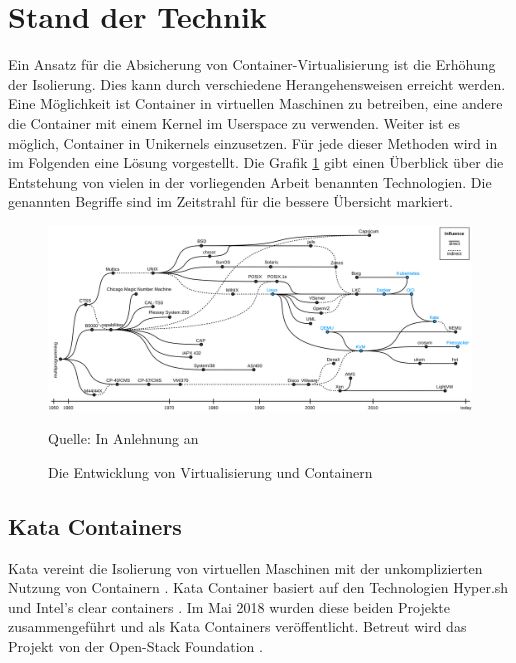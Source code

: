 \section{Stand der Technik}
Ein Ansatz für die Absicherung von Container-Virtualisierung ist die Erhöhung der Isolierung. Dies kann durch verschiedene Herangehensweisen erreicht werden. Eine Möglichkeit ist Container in virtuellen Maschinen zu betreiben, eine andere die Container mit einem Kernel im Userspace zu verwenden. Weiter ist es möglich, Container in Unikernels einzusetzen. Für jede dieser Methoden wird in im Folgenden eine Lösung vorgestellt.
Die Grafik \ref{fig:zeitstrahl_vm_container} gibt einen Überblick über die Entstehung von vielen in der vorliegenden Arbeit benannten Technologien. Die genannten Begriffe sind im Zeitstrahl für die bessere Übersicht markiert.

\begin{figure}[hb]
	\centering
	\includegraphics[width=1\linewidth]{gfx/VM_Container_Zeitstrahl.png}
	\caption{Die Entwicklung von Virtualisierung und Containern} 
	\footnotesize Quelle: In Anlehnung an \cite[][2]{Randal.28.04.2019}
	\label{fig:zeitstrahl_vm_container}
\end{figure}
\newpage

\subsection{Kata Containers}
\label{sec:kata}
Kata vereint die Isolierung von virtuellen Maschinen mit der unkomplizierten Nutzung von Containern \cite[vgl.][28]{TamHanna.01.11.2019}. Kata Container basiert auf den Technologien Hyper.sh und Intel’s clear containers  \cite[vgl.][6]{Scholl.2019}. Im Mai 2018 wurden diese beiden Projekte zusammengeführt und als Kata Containers veröffentlicht. Betreut wird das Projekt von der Open-Stack Foundation \cite[vgl.][106]{UdoSeidel.2018}.

